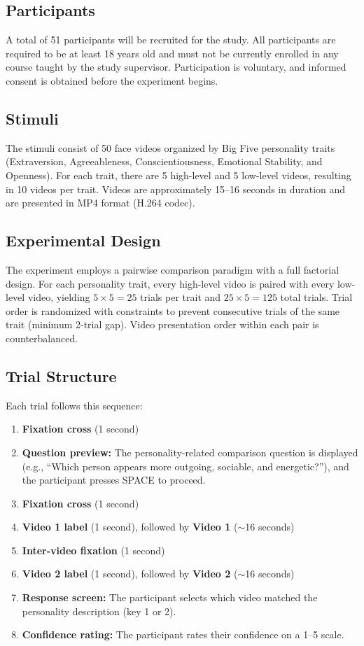 \documentclass[12pt,a4paper]{article}
\begin{document}
\subsection{Participants}

A total of 51 participants will be recruited for the study. All participants are required to be at least 18 years old and must not be currently enrolled in any course taught by the study supervisor. Participation is voluntary, and informed consent is obtained before the experiment begins.

\subsection{Stimuli}

The stimuli consist of 50 face videos organized by Big Five personality traits (Extraversion, Agreeableness, Conscientiousness, Emotional Stability, and Openness). For each trait, there are 5 high-level and 5 low-level videos, resulting in 10 videos per trait. Videos are approximately 15--16 seconds in duration and are presented in MP4 format (H.264 codec).

\subsection{Experimental Design}

The experiment employs a pairwise comparison paradigm with a full factorial design. For each personality trait, every high-level video is paired with every low-level video, yielding $5 \times 5 = 25$ trials per trait and $25 \times 5 = 125$ total trials. Trial order is randomized with constraints to prevent consecutive trials of the same trait (minimum 2-trial gap). Video presentation order within each pair is counterbalanced.

\subsection{Trial Structure}

Each trial follows this sequence:
\begin{enumerate}
    \item \textbf{Fixation cross} (1 second)
    \item \textbf{Question preview:} The personality-related comparison question is displayed (e.g., ``Which person appears more outgoing, sociable, and energetic?''), and the participant presses SPACE to proceed.
    \item \textbf{Fixation cross} (1 second)
    \item \textbf{Video 1 label} (1 second), followed by \textbf{Video 1} ($\sim$16 seconds)
    \item \textbf{Inter-video fixation} (1 second)
    \item \textbf{Video 2 label} (1 second), followed by \textbf{Video 2} ($\sim$16 seconds)
    \item \textbf{Response screen:} The participant selects which video matched the personality description (key 1 or 2).
    \item \textbf{Confidence rating:} The participant rates their confidence on a 1--5 scale.
\end{enumerate}
\end{document}
